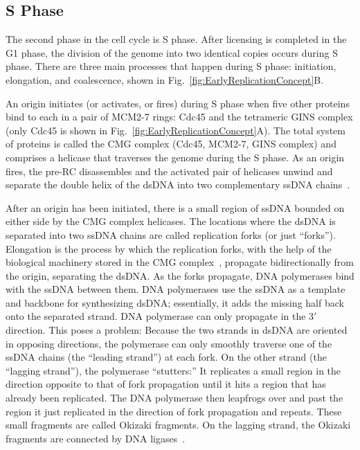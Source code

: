 		
		\subsection{S Phase}
		\label{subsec:SPhase}
		
		The second phase in the cell cycle is S phase.
		After licensing is completed in the G1 phase, the division of the genome into two identical copies occurs during S phase.
		There are three main processes that happen during S phase: initiation, elongation, and coalescence, shown in Fig.~\ref{fig:EarlyReplicationConcept}B.
		
		An origin initiates (or activates, or fires) during S phase when five other proteins bind to each in a pair of MCM2-7 rings:
		Cdc45 and the tetrameric GINS complex (only Cdc45 is shown in Fig.~\ref{fig:EarlyReplicationConcept}A).
		The total system of proteins is called the CMG complex (Cdc45, MCM2-7, GINS complex) and comprises a helicase that traverses the genome during the S phase.
		As an origin fires, the pre-RC disassembles and the activated pair of helicases unwind and separate the double helix of the dsDNA into two complementary ssDNA chains~\cite{GINSComplex}.
		
		After an origin has been initiated, there is a small region of ssDNA bounded on either side by the CMG complex helicases.
		The locations where the dsDNA is separated into two ssDNA chains are called replication forks (or just ``forks'').
		Elongation is the process by which the replication forks, with the help of the biological machinery stored in the CMG complex~\cite{PurifiedProteins}, propagate bidirectionally from the origin, separating the dsDNA.
		As the forks propagate, DNA polymerases bind with the ssDNA between them.
		DNA polymerases use the ssDNA as a template and backbone for synthesizing dsDNA; essentially, it adds the missing half back onto the separated strand.
		DNA polymerase can only propagate in the $3'$ direction.
		This poses a problem:
		Because the two strands in dsDNA are oriented in opposing directions, the polymerase can only smoothly traverse one of the ssDNA chains (the ``leading strand'') at each fork.
		On the other strand (the ``lagging strand''), the polymerase ``stutters:''
		It replicates a small region in the direction opposite to that of fork propagation until it hits a region that has already been replicated.
		The DNA polymerase then leapfrogs over and past the region it just replicated in the direction of fork propagation and repeats.
		These small fragments are called Okizaki fragments.
		On the lagging strand, the Okizaki fragments are connected by DNA ligases~\cite{MolecularCellBiology, CellMolApproach, OriginsReview}.
		

